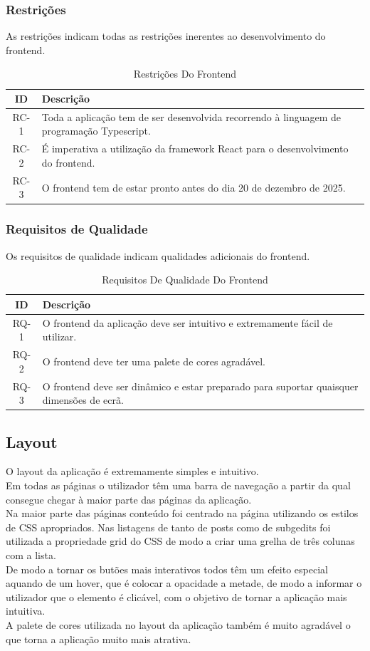 \documentclass{article}
\begin{document}
	\subsubsection{Restrições}
	As restrições indicam todas as restrições inerentes ao desenvolvimento do frontend.
	\begin{table}[H]
		\centering
		\begin{tabular}{|c|p{14cm}|}
			\hline
			ID & Descrição \\
			\hline
			RC-1 & Toda a aplicação tem de ser desenvolvida recorrendo à linguagem de programação Typescript. \\
			\hline
			RC-2 & É imperativa a utilização da framework React para o desenvolvimento do frontend. \\
			\hline
			RC-3 & O frontend tem de estar pronto antes do dia 20 de dezembro de 2025. \\
			\hline
		\end{tabular}
		\caption{Restrições Do Frontend}
	\end{table}
	\subsubsection{Requisitos de Qualidade}
	Os requisitos de qualidade indicam qualidades adicionais do frontend.
	\begin{table}[H]
		\centering
		\begin{tabular}{|c|p{14cm}|}
			\hline
			ID & Descrição \\
			\hline
			RQ-1 & O frontend da aplicação deve ser intuitivo e extremamente fácil de utilizar. \\
			\hline
			RQ-2 & O frontend deve ter uma palete de cores agradável. \\
			\hline
			RQ-3 & O frontend deve ser dinâmico e estar preparado para suportar quaisquer dimensões de ecrã. \\
			\hline
		\end{tabular}
		\caption{Requisitos De Qualidade Do Frontend}
	\end{table}
	\subsection{Layout}
	O layout da aplicação é extremamente simples e intuitivo.\\
	Em todas as páginas o utilizador têm uma barra de navegação a partir da qual consegue chegar à maior parte das páginas da aplicação.\\
	Na maior parte das páginas conteúdo foi centrado na página utilizando os estilos de CSS apropriados. Nas listagens de tanto de posts como de subgedits foi utilizada a propriedade grid do CSS de modo a criar uma grelha de três colunas com a lista.\\
	De modo a tornar os butões mais interativos todos têm um efeito especial aquando de um hover, que é colocar a opacidade a metade, de modo a informar o utilizador que o elemento é clicável, com o objetivo de tornar a aplicação mais intuitiva.\\
	A palete de cores utilizada no layout da aplicação também é muito agradável o que torna a aplicação muito mais atrativa.\\
	
\end{document}
